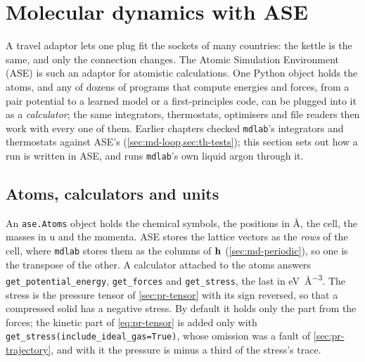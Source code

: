 \section{Molecular dynamics with ASE}
\label{sec:ip-ase}

A travel adaptor lets one plug fit the sockets of many countries: the
kettle is the same, and only the connection changes. The Atomic
Simulation Environment (ASE)\cite{Larsen2017} is such an adaptor for
atomistic calculations. One Python object holds the atoms, and any of
dozens of programs that compute energies and forces, from a pair
potential to a learned model or a first-principles code, can be plugged
into it as a \emph{calculator}; the same integrators, thermostats,
optimisers and file readers then work with every one of them. Earlier
chapters checked \texttt{mdlab}'s integrators and thermostats against
ASE's (\cref{sec:md-loop,sec:th-tests}); this section sets out how a run
is written in ASE, and runs \texttt{mdlab}'s own liquid argon through it.

\subsection*{Atoms, calculators and units}

An \texttt{ase.Atoms} object holds the chemical symbols, the positions in
\si{\angstrom}, the cell, the masses in \si{\amu} and the momenta. ASE
stores the lattice vectors as the \emph{rows} of the cell, where
\texttt{mdlab} stores them as the columns of $\bm{\mathrm{h}}$ (\cref{sec:md-periodic}),
so one is the transpose of the other. A calculator attached to the atoms
answers \texttt{get\_potential\_energy}, \texttt{get\_forces} and
\texttt{get\_stress}, the last in \si{\electronvolt\per\angstrom\cubed}.
The stress is the pressure tensor of \cref{sec:pr-tensor} with its sign
reversed, so that a compressed solid has a negative stress. By default it
holds only the part from the forces; the kinetic part of
\cref{eq:pr-tensor} is added only with
\texttt{get\_stress(include\_\allowbreak ideal\_gas=True)}, whose omission
was a fault of \cref{sec:pr-trajectory}, and with it the pressure is minus
a third of the stress's trace.


